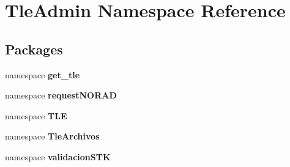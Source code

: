 \section{\-Tle\-Admin \-Namespace \-Reference}
\label{namespace_tle_admin}
\subsection*{\-Packages}
\begin{DoxyCompactItemize}
\item 
namespace {\bf get\-\_\-tle}
\item 
namespace {\bf request\-N\-O\-R\-A\-D}
\item 
namespace {\bf \-T\-L\-E}
\item 
namespace {\bf \-Tle\-Archivos}
\item 
namespace {\bf validacion\-S\-T\-K}
\end{DoxyCompactItemize}
